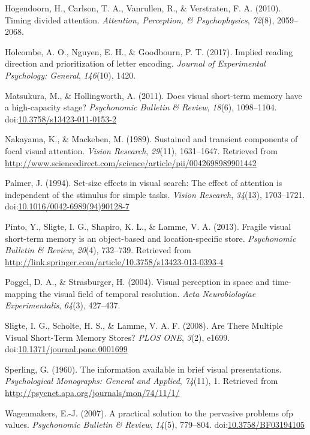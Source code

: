 \documentclass[,man]{apa6}
\theoremstyle{definition}
\theoremstyle{definition}
\theoremstyle{definition}
\theoremstyle{remark}
\begin{document}
\hypertarget{ref-hogendoorn_timing_2010}{}
Hogendoorn, H., Carlson, T. A., Vanrullen, R., \& Verstraten, F. A.
(2010). Timing divided attention. \emph{Attention, Perception, \&
Psychophysics}, \emph{72}(8), 2059--2068.

\hypertarget{ref-holcombe_implied_2017}{}
Holcombe, A. O., Nguyen, E. H., \& Goodbourn, P. T. (2017). Implied
reading direction and prioritization of letter encoding. \emph{Journal
of Experimental Psychology: General}, \emph{146}(10), 1420.

\hypertarget{ref-matsukura_does_2011}{}
Matsukura, M., \& Hollingworth, A. (2011). Does visual short-term memory
have a high-capacity stage? \emph{Psychonomic Bulletin \& Review},
\emph{18}(6), 1098--1104.
doi:\href{https://doi.org/10.3758/s13423-011-0153-2}{10.3758/s13423-011-0153-2}

\hypertarget{ref-nakayama_sustained_1989}{}
Nakayama, K., \& Mackeben, M. (1989). Sustained and transient components
of focal visual attention. \emph{Vision Research}, \emph{29}(11),
1631--1647. Retrieved from
\url{http://www.sciencedirect.com/science/article/pii/0042698989901442}

\hypertarget{ref-palmer_set-size_1994}{}
Palmer, J. (1994). Set-size effects in visual search: The effect of
attention is independent of the stimulus for simple tasks. \emph{Vision
Research}, \emph{34}(13), 1703--1721.
doi:\href{https://doi.org/10.1016/0042-6989(94)90128-7}{10.1016/0042-6989(94)90128-7}

\hypertarget{ref-pinto_fragile_2013}{}
Pinto, Y., Sligte, I. G., Shapiro, K. L., \& Lamme, V. A. (2013).
Fragile visual short-term memory is an object-based and
location-specific store. \emph{Psychonomic Bulletin \& Review},
\emph{20}(4), 732--739. Retrieved from
\url{http://link.springer.com/article/10.3758/s13423-013-0393-4}

\hypertarget{ref-poggel_visual_2004}{}
Poggel, D. A., \& Strasburger, H. (2004). Visual perception in space and
time-mapping the visual field of temporal resolution. \emph{Acta
Neurobiologiae Experimentalis}, \emph{64}(3), 427--437.

\hypertarget{ref-sligte_are_2008}{}
Sligte, I. G., Scholte, H. S., \& Lamme, V. A. F. (2008). Are There
Multiple Visual Short-Term Memory Stores? \emph{PLOS ONE}, \emph{3}(2),
e1699.
doi:\href{https://doi.org/10.1371/journal.pone.0001699}{10.1371/journal.pone.0001699}

\hypertarget{ref-sperling_information_1960}{}
Sperling, G. (1960). The information available in brief visual
presentations. \emph{Psychological Monographs: General and Applied},
\emph{74}(11), 1. Retrieved from
\url{http://psycnet.apa.org/journals/mon/74/11/1/}

\hypertarget{ref-wagenmakers_practical_2007}{}
Wagenmakers, E.-J. (2007). A practical solution to the pervasive
problems ofp values. \emph{Psychonomic Bulletin \& Review},
\emph{14}(5), 779--804.
doi:\href{https://doi.org/10.3758/BF03194105}{10.3758/BF03194105}
\end{document}
